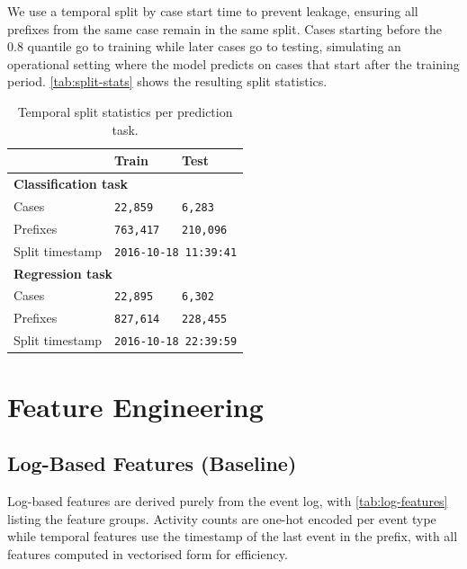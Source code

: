 \documentclass[runningheads]{llncs}
\begin{document}
We use a temporal split by case start time to prevent leakage, ensuring all
prefixes from the same case remain in the same split. Cases starting before the 0.8
quantile go to training while later cases go to testing, simulating an
operational setting where the model predicts on cases that start after the
training period. \autoref{tab:split-stats} shows the resulting split
statistics.

\begin{table}[H]
    \centering
    \caption{Temporal split statistics per prediction task.}
    \label{tab:split-stats}
    \begin{tabularx}{\textwidth}{lXX}
        \toprule
        & Train & Test \\
        \midrule

        \multicolumn{3}{l}{\textbf{Classification task}} \\
        Cases & \texttt{22,859} & \texttt{6,283} \\
        Prefixes & \texttt{763,417} & \texttt{210,096} \\
        Split timestamp & \multicolumn{2}{X}{\texttt{2016-10-18 11:39:41}} \\
        
        \midrule
        \multicolumn{3}{l}{\textbf{Regression task}} \\
        Cases & \texttt{22,895} & \texttt{6,302} \\
        Prefixes & \texttt{827,614} & \texttt{228,455} \\
        Split timestamp & \multicolumn{2}{X}{\texttt{2016-10-18 22:39:59}} \\

        \bottomrule
    \end{tabularx}
\end{table}

\section{Feature Engineering}
\label{sec:features}

\subsection{Log-Based Features (Baseline)}
\label{sec:log-features}

Log-based features are derived purely from the event log, with \autoref{tab:log-features}
listing the feature groups. Activity counts are one-hot encoded per event type
while temporal features use the timestamp of the last event in the prefix, with all
features computed in vectorised form for efficiency.
\end{document}
